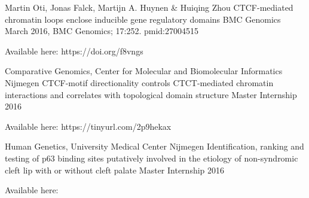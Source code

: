 

\begin{cventries}

\cventry
  {Martin Oti, Jonas Falck, Martijn A. Huynen \& Huiqing Zhou}
  {CTCF-mediated chromatin loops enclose inducible gene regulatory domains} %
  {BMC Genomics}
  {March 2016, BMC Genomics; 17:252. pmid:27004515} %
  {    
  \begin{cvitems} %
    \item {Available here: https://doi.org/f8vngs}
  \end{cvitems}
  }
\cventry
  {Comparative Genomics,  Center for Molecular and Biomolecular Informatics Nijmegen} %
  {CTCF-motif directionality controls CTCT-mediated chromatin interactions and correlates with topological domain structure} %
  {Master Internship} %
  {2016} %
  {
    \begin{cvitems} %
      \item {Available here: https://tinyurl.com/2p9hekax}
    \end{cvitems}
  }
\cventry
  {Human Genetics, University Medical Center Nijmegen} %
  {Identification, ranking and testing of p63 binding sites putatively involved in the etiology of non-syndromic cleft lip with or without cleft palate} %
  {Master Internship} %
  {2016} %
  {
    \begin{cvitems} %
      \item {Available here: }
    \end{cvitems}
  }

\end{cventries}
